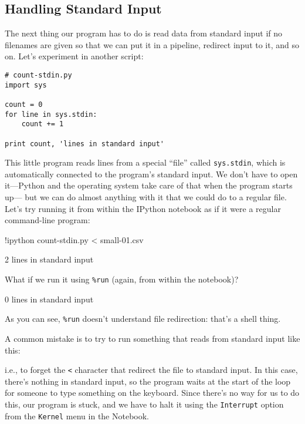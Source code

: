 \documentclass{book}
\begin{document}
\subsection{Handling Standard Input}

The next thing our program has to do is read data from standard input if
no filenames are given so that we can put it in a pipeline, redirect
input to it, and so on. Let's experiment in another script:

\begin{Verbatim}
# count-stdin.py
import sys

count = 0
for line in sys.stdin:
    count += 1

print count, 'lines in standard input'
\end{Verbatim}

This little program reads lines from a special ``file'' called
\texttt{sys.stdin}, which is automatically connected to the program's
standard input. We don't have to open it---Python and the operating
system take care of that when the program starts up--- but we can do
almost anything with it that we could do to a regular file. Let's try
running it from within the IPython notebook as if it were a regular command-line program:

\begin{VerbIn}
!ipython count-stdin.py < small-01.csv
\end{VerbIn}

\begin{VerbOut}
2 lines in standard input
\end{VerbOut}

What if we run it using \texttt{\%run} (again, from within the notebook)?

\begin{VerbIn}
\end{VerbIn}

\begin{VerbOut}
0 lines in standard input
\end{VerbOut}

As you can see, \texttt{\%run} doesn't understand file redirection:
that's a shell thing.

A common mistake is to try to run something that reads from standard
input like this:


i.e., to forget the \texttt{\textless{}} character that redirect the
file to standard input. In this case, there's nothing in standard input,
so the program waits at the start of the loop for someone to type
something on the keyboard. Since there's no way for us to do this, our
program is stuck, and we have to halt it using the \texttt{Interrupt}
option from the \texttt{Kernel} menu in the Notebook.
\end{document}
